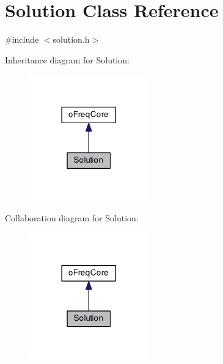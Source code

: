 \hypertarget{class_solution}{\section{Solution Class Reference}
\label{class_solution}
}


{\ttfamily \#include $<$solution.\-h$>$}



Inheritance diagram for Solution\-:\nopagebreak
\begin{figure}[H]
\begin{center}
\leavevmode
\includegraphics[width=146pt]{class_solution__inherit__graph}
\end{center}
\end{figure}


Collaboration diagram for Solution\-:\nopagebreak
\begin{figure}[H]
\begin{center}
\leavevmode
\includegraphics[width=146pt]{class_solution__coll__graph}
\end{center}
\end{figure}
